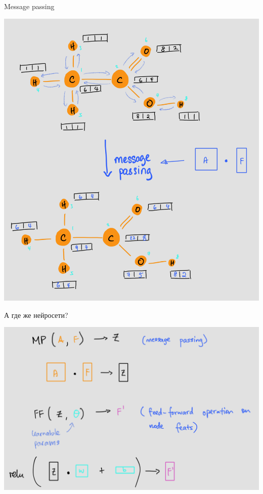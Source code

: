 \documentclass[11pt,aspectratio=169,handout]{beamer}
\begin{document}
\begin{frame}{Message passing}

\begin{center}
\includegraphics[scale=0.13]{images/message-passing-ethanoic-acid.png}
\end{center}

\end{frame}

\begin{frame}{А где же нейросети?}

\begin{center}
\includegraphics[scale=0.15]{images/message-passing-layer.png}
\end{center}

\end{frame}
\end{document}
